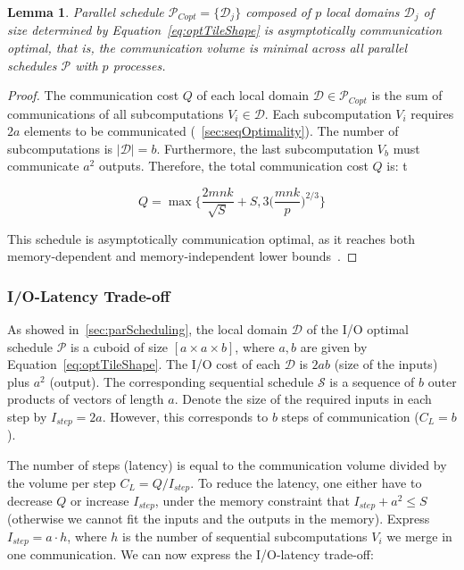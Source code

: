\documentclass[sigplan,review,anonymous,10pt]{acmart}\settopmatter{printfolios=true,printccs=false,printacmref=false}
\newtheorem{lma}{Lemma}
\begin{document}
\begin{lma}
  \label{lma:parSchedule}
  Parallel schedule $\mathcal{P}_{Copt} = \{\mathcal{D}_j\}$ composed of $p$ 
  local domains $\mathcal{D}_j$ of size 
  determined by Equation~\ref{eq:optTileShape} is asymptotically 
  communication optimal, that is, the communication volume is minimal across 
  all parallel schedules $\mathcal{P}$ with $p$ processes.
\end{lma}

\begin{proof}
The communication cost $Q$ of each local domain $\mathcal{D} \in 
\mathcal{P}_{Copt}$ is the sum of communications of all subcomputations $V_i 
\in \mathcal{D}$. Each subcomputation $V_i$ requires $2a$ elements to be 
communicated (~\cref{sec:seqOptimality}). The number of subcomputations is 
$|\mathcal{D}| = b$. Furthermore, the last subcomputation $V_b$ must 
communicate $a^2$ outputs. Therefore, the total communication cost $Q$ 
is: 
t%


$$Q = \max\Big\{\frac{2mnk}{\sqrt{S}} + 
S, 3\Big(\frac{mnk}{p}\Big)^{2/3}  \Big\}$$

This schedule is asymptotically communication optimal, as it reaches both 
memory-dependent and 
memory-independent lower bounds~\cite{memIndependentBound}.
\end{proof}


\subsubsection{I/O-Latency Trade-off}
As showed in~\cref{sec:parScheduling}, the local domain $\mathcal{D}$ of the 
I/O optimal 
schedule $\mathcal{P}$ is a cuboid of size $[a \times a \times b]$, where $a, 
b$ are given by Equation~\ref{eq:optTileShape}. The I/O cost of each  
$\mathcal{D}$ is $2ab$ (size of the inputs) plus $a^2$ (output). 
 The corresponding sequential 
schedule $\mathcal{S}$ is a sequence of $b$ outer products of vectors of length 
$a$. Denote the size of the required inputs in each step by $I_{step} = 2a$. 
However, this corresponds to $b$ steps of communication ($C_L = b$).

The number of steps (latency) is equal to the communication volume divided by 
the volume per step $C_L = Q/I_{step}$. To reduce the latency, one 
either have to decrease $Q$ or increase $I_{step}$, under the memory 
constraint that $I_{step} + a^2 \le S$ (otherwise we cannot fit the inputs and 
the outputs in the memory). Express $I_{step} = a \cdot h$, where $h$ is the 
number of sequential subcomputations $V_i$ we merge in one communication. We 
can now express the I/O-latency trade-off:
\end{document}
